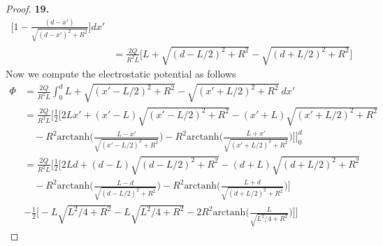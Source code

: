 \documentclass[11pt]{article}
\theoremstyle{definition}
\begin{document}
\begin{proof}{\textbf{19.}}
\begin{align*}
        \bigg[1-\frac{(d-x')}{\sqrt{(d-x')^2 + R^2}}\bigg]
        dx'\\
        &= \frac{2Q}{R^2 L}\bigg[
            L + \sqrt{(d-L/2)^2 + R^2} - \sqrt{(d+L/2)^2 + R^2} 
        \bigg]
    \end{align*}
    Now we compute the electrostatic potential as follows
    \begin{align*}
        \Phi &= \frac{2Q}{R^2 L}\int_0^d 
        L + \sqrt{(x'-L/2)^2 + R^2} - \sqrt{(x'+L/2)^2 + R^2}~dx'\\
        &= \frac{2Q}{R^2 L}
        \bigg[
            \frac{1}{2}
            \bigg[ 2Lx' + (x'-L)\sqrt{(x'-L/2)^2 + R^2}
            - (x'+L)\sqrt{(x'+L/2)^2 + R^2}\\
            &\quad-R^2\text{arctanh}\bigg(
                \frac{L-x'}{\sqrt{(x'-L/2)^2 + R^2}}
            \bigg)
            -R^2\text{arctanh}\bigg(
                \frac{L+x'}{\sqrt{(x'+L/2)^2 + R^2}}
            \bigg)
        \bigg]\bigg]_0^d\\
        &= \frac{2Q}{R^2 L}
        \bigg[
            \frac{1}{2}
            \bigg[
            2Ld + (d-L)\sqrt{(d-L/2)^2 + R^2}
        - (d+L)\sqrt{(d+L/2)^2 + R^2}\\
        &\quad-R^2\text{arctanh}\bigg(
                \frac{L-d}{\sqrt{(d-L/2)^2 + R^2}}
            \bigg)
        -R^2\text{arctanh}\bigg(
                \frac{L+d}{\sqrt{(d+L/2)^2 + R^2}}
            \bigg)
        \bigg]\\
        &-\frac{1}{2}
        \bigg[
            -L\sqrt{L^2/4 + R^2}
            - L\sqrt{L^2/4 + R^2}
            -2R^2\text{arctanh}\bigg(\frac{L}{\sqrt{L^2/4 + R^2}}\bigg)
        \bigg]
        \bigg]
    \end{align*}

\end{proof}
\cleardoublepage
\end{document}
